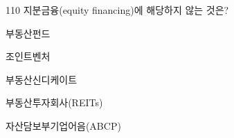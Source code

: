 \begin{question}{110}
지분금융(equity financing)에 해당하지 않는 것은?
\begin{choices}
  \item 부동산펀드
  \item 조인트벤처
  \item 부동산신디케이트
  \item 부동산투자회사(REITs)
  \item 자산담보부기업어음(ABCP)
\end{choices}
\end{question}
